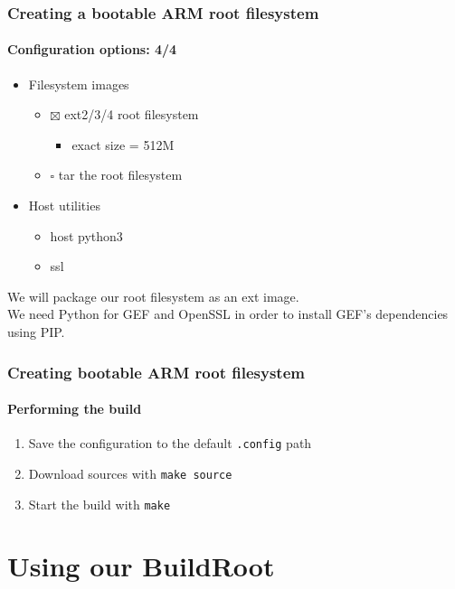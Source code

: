 \begin{frame}
  \frametitle{Creating a bootable ARM root filesystem}
  \framesubtitle{Configuration options: 4/4}
  \begin{itemize}
    \item Filesystem images
    \begin{itemize}
      \item $\boxtimes$ ext2/3/4 root filesystem
      \begin{itemize}
        \item exact size = 512M
      \end{itemize}
      \item $\square$ tar the root filesystem
    \end{itemize}
    \item Host utilities
    \begin{itemize}
      \item host python3
      \item ssl
    \end{itemize}
  \end{itemize}
\end{frame}
 {
  We will package our root filesystem as an ext image. \\
  We need Python for GEF and OpenSSL in order to install GEF's dependencies using PIP.
}

\begin{frame}
  \frametitle{Creating bootable ARM root filesystem}
  \framesubtitle{Performing the build}
  \begin{enumerate}
    \item Save the configuration to the default \texttt{.config} path
    \item Download sources with \texttt{make source}
    \item Start the build with \texttt{make}
  \end{enumerate}
\end{frame}
\section{Using our BuildRoot}
